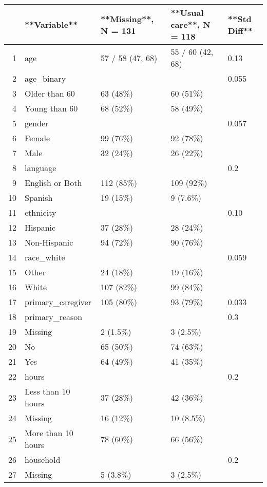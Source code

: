 \begin{table}[ht]
\centering
\begin{tabular}{rllll}
  \hline
 & **Variable** & **Missing**, N = 131 & **Usual care**, N = 118 & **Std Diff** \\ 
  \hline
1 & age & 57 / 58 (47, 68) & 55 / 60 (42, 68) & 0.13 \\ 
  2 & age\_binary &  &  & 0.055 \\ 
  3 & Older than 60 & 63 (48\%) & 60 (51\%) &  \\ 
  4 & Young than 60 & 68 (52\%) & 58 (49\%) &  \\ 
  5 & gender &  &  & 0.057 \\ 
  6 & Female & 99 (76\%) & 92 (78\%) &  \\ 
  7 & Male & 32 (24\%) & 26 (22\%) &  \\ 
  8 & language &  &  & 0.2 \\ 
  9 & English or Both & 112 (85\%) & 109 (92\%) &  \\ 
  10 & Spanish & 19 (15\%) & 9 (7.6\%) &  \\ 
  11 & ethnicity &  &  & 0.10 \\ 
  12 & Hispanic & 37 (28\%) & 28 (24\%) &  \\ 
  13 & Non-Hispanic & 94 (72\%) & 90 (76\%) &  \\ 
  14 & race\_white &  &  & 0.059 \\ 
  15 & Other & 24 (18\%) & 19 (16\%) &  \\ 
  16 & White & 107 (82\%) & 99 (84\%) &  \\ 
  17 & primary\_caregiver & 105 (80\%) & 93 (79\%) & 0.033 \\ 
  18 & primary\_reason &  &  & 0.3 \\ 
  19 & Missing & 2 (1.5\%) & 3 (2.5\%) &  \\ 
  20 & No & 65 (50\%) & 74 (63\%) &  \\ 
  21 & Yes & 64 (49\%) & 41 (35\%) &  \\ 
  22 & hours &  &  & 0.2 \\ 
  23 & Less than 10 hours & 37 (28\%) & 42 (36\%) &  \\ 
  24 & Missing & 16 (12\%) & 10 (8.5\%) &  \\ 
  25 & More than 10 hours & 78 (60\%) & 66 (56\%) &  \\ 
  26 & household &  &  & 0.2 \\ 
  27 & Missing & 5 (3.8\%) & 3 (2.5\%) &  \\ 

\end{tabular}
\end{table}
